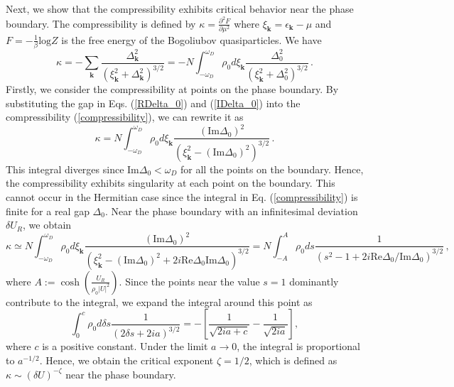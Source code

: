 \documentclass[aps,prl,twocolumn,superscriptaddress]{revtex4-1}
\begin{document}
\begin{bibunit}
Next, we show that the compressibility exhibits critical behavior near the phase boundary. The compressibility is defined by $\kappa=\frac{\partial^2F}{\partial\mu^2}$ where $\xi_{\bm{k}}=\epsilon_{\bm{k}}-\mu$ and $F=-\frac{1}{\beta}\text{log}Z$ is the free energy of the Bogoliubov quasiparticles. We have
\begin{equation}
	\kappa = - \sum_{\bm{k}} \frac{\Delta_{\bm{k}}^2}{(\xi_{\bm{k}}^2 +
		\Delta_{\bm{k}}^2)^{3 / 2}} = - N\int_{- \omega_D}^{\omega_D} \rho_0 d
	\xi_{\bm{k}} \frac{\Delta_0^2}{(\xi_{\bm{k}}^2 + \Delta_0^2)^{3
			/ 2}}\,.
	\label{compressibility}
\end{equation}
Firstly, we consider the compressibility at points on the phase boundary. By substituting the gap in Eqs. (\ref{RDelta_0}) and (\ref{IDelta_0}) into the compressibility (\ref{compressibility}), we can rewrite it as
\begin{equation}
	\kappa= N\int_{- \omega_D}^{\omega_D} \rho_0 d \xi_{\bm{k}}
	\frac{(\text{Im} \Delta_0)^2}{(\xi_{\bm{k}}^2 - (\text{Im}
		\Delta_0)^2)^{3 / 2}}\,.
\end{equation}
This integral diverges since $\text{Im} \Delta_0 < \omega_D$ for all the points on the boundary. Hence, the compressibility exhibits singularity at each point on the boundary. This cannot occur in the Hermitian case since the integral in Eq. (\ref{compressibility}) is finite for a real gap $\Delta_0$. Near the phase boundary with an infinitesimal deviation $\delta U_R$, we obtain
\begin{equation}
	\kappa\simeq N\int_{- \omega_D}^{\omega_D} \rho_0 d \xi_{\bm{k}}
	\frac{(\text{Im} \Delta_0)^2}{(\xi_{\bm{k}}^2 - (\text{Im} \Delta_0)^2
		+ 2 i \text{Re} \Delta_0 \text{Im} \Delta_0)^{3 / 2}} = N\int_{- A}^A \rho_0
	ds \frac{1}{(s^2 - 1 + 2 i \text{Re}
		\Delta_0 / \text{Im} \Delta_0)^{3 / 2}}\,,
\end{equation}
where $A := \cosh \left( \frac{U_R}{\rho_0 | U |^2} \right)$. Since the points near the value $s = 1$ dominantly contribute to the integral, we expand the integral around this point as
\begin{equation}
	\int_{0}^{c} \rho_0 d \delta s \frac{1}{(2 \delta
		s+ 2 i a)^{3 / 2}}=-[\frac{1}{\sqrt{2ia+c}}-\frac{1}{\sqrt{2ia}}],
\end{equation}
where $c$ is a positive constant. Under the limit $a\to0$, the integral is proportional to $a^{-1/2}$. Hence, we obtain the critical exponent $\zeta = 1 / 2$, which is defined as $\kappa \sim (\delta U)^{- \zeta}$ near the phase boundary.


\end{bibunit}
\end{document}
